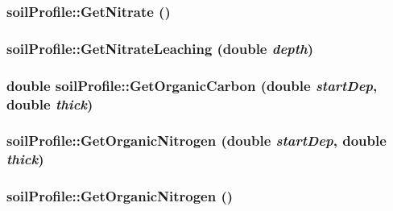 \label{classsoil_profile_a52af6d32aff7208063bd86a2a8b3c25b}
\hypertarget{classsoil_profile_a753455cef3dae233090a481b833e25c6}{
\subsubsection[{GetNitrate}]{ soilProfile::GetNitrate ()}}
\label{classsoil_profile_a753455cef3dae233090a481b833e25c6}
\hypertarget{classsoil_profile_aefe1b8475041b54e5f0a1fd6cdebff2a}{
\subsubsection[{GetNitrateLeaching}]{ soilProfile::GetNitrateLeaching (double {\em depth})}}
\label{classsoil_profile_aefe1b8475041b54e5f0a1fd6cdebff2a}
\hypertarget{classsoil_profile_ac3acd0216f995cbda5b47d393c5d6e98}{
\subsubsection[{GetOrganicCarbon}]{\setlength{\rightskip}{0pt plus 5cm}double soilProfile::GetOrganicCarbon (double {\em startDep}, \/  double {\em thick})}}
\label{classsoil_profile_ac3acd0216f995cbda5b47d393c5d6e98}
\hypertarget{classsoil_profile_a4fc437a3643651526cdba9cb737d81bb}{
\subsubsection[{GetOrganicNitrogen}]{ soilProfile::GetOrganicNitrogen (double {\em startDep}, \/  double {\em thick})}}
\label{classsoil_profile_a4fc437a3643651526cdba9cb737d81bb}
\hypertarget{classsoil_profile_aee00c88c701f2ef848b9c96a3013e294}{
\subsubsection[{GetOrganicNitrogen}]{ soilProfile::GetOrganicNitrogen ()}}
